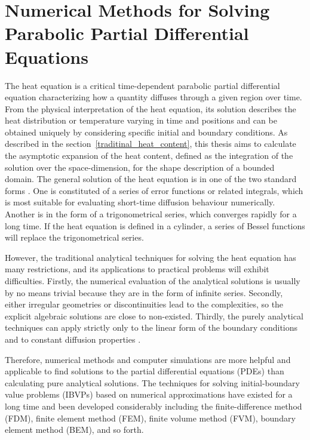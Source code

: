 \section{Numerical Methods for Solving Parabolic Partial Differential Equations}\label{numerical_methdos}


The heat equation is a critical time-dependent parabolic partial
differential equation characterizing how a quantity diffuses through a
given region over time. From the physical interpretation of the heat
equation, its solution describes the heat distribution or temperature
varying in time and positions and can be obtained uniquely by
considering specific initial and boundary conditions. As described in
the section~\ref{traditinal_heat_content}, this thesis aims to
calculate the asymptotic expansion of the heat content, defined as the
integration of the solution over the space-dimension, for the shape
description of a bounded domain.  The general solution of the heat
equation is in one of the two standard forms
\cite{crank1979mathematics}. One is constituted of a series of error
functions or related integrals, which is most suitable for evaluating
short-time diffusion behaviour numerically. Another is in the form of
a trigonometrical series, which converges rapidly for a long time. If
the heat equation is defined in a cylinder, a series of Bessel
functions will replace the trigonometrical series.

However, the traditional analytical techniques for solving the heat
equation has many restrictions, and its applications to practical
problems will exhibit difficulties. Firstly, the numerical evaluation
of the analytical solutions is usually by no means trivial because
they are in the form of infinite series. Secondly, either irregular
geometries or discontinuities lead to the complexities, so the
explicit algebraic solutions are close to non-existed. Thirdly, the
purely analytical techniques can apply strictly only to the linear
form of the boundary conditions and to constant diffusion properties
\cite{crank1979mathematics}.

Therefore, numerical methods and computer simulations are more helpful
and applicable to find solutions to the partial differential equations
(PDEs) than calculating pure analytical solutions. The techniques for
solving initial-boundary value problems (IBVPs) based on numerical
approximations have existed for a long time and been developed
considerably including the finite-difference method (FDM), finite
element method (FEM), finite volume method (FVM), boundary element
method (BEM), and so forth.





